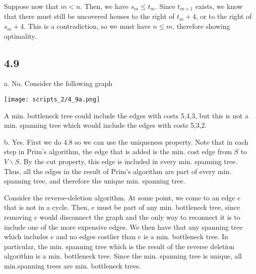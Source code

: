 \documentclass{article}
\begin{document}
Suppose now that $m<n$. Then, we have $s_m\leq t_m$. Since $t_{m+1}$ exists, we know that there must still be uncovered houses to the right of $t_m+4$, or to the right of $s_m+4$. This is a contradiction, so we must have $n\leq m$, therefore showing optimality.
\subsection*{4.9}
a. No. Consider the following graph

\texttt{[image: scripts\_2/4\_9a.png]}

A min. bottleneck tree could include the edges with costs 5,4,3, but this is not a min. spanning tree which would include the edges with costs 5,3,2.

b. Yes. First we do 4.8 so we can use the uniqueness property. Note that in each step in Prim's algorithm, the edge that is added is the min. cost edge from $S$ to $V\backslash S$. By the cut property, this edge is included in every min. spanning tree. Thus, all the edges in the result of Prim's algorithm are part of every min. spanning tree, and therefore the unique  min. spanning tree.

Consider the reverse-deletion algorithm. At some point, we come to an edge $e$ that is not in a cycle. Then, $e$ must be part of any min. bottleneck tree, since removing $e$ would disconnect the graph and the only way to reconnect it is to include one of the more expensive edges. We then have that any spanning tree which includes $e$ and no edges costlier than $e$ is a min. bottleneck tree. In particular, the min. spanning tree which is the result of the reverse deletion algorithm is a min. bottleneck tree. Since the min. spanning tree is unique, all min.spanning trees are min. bottleneck trees.
\end{document}
